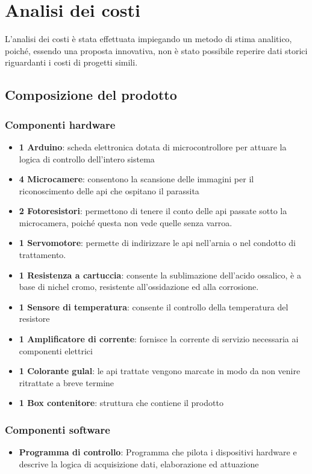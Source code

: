 \section{Analisi dei costi}
L'analisi dei costi è stata effettuata impiegando un metodo di stima analitico,
poiché, essendo una proposta innovativa, non è stato possibile reperire dati
storici riguardanti i costi di progetti simili.
%
%
\subsection{Composizione del prodotto}
\subsubsection{Componenti hardware}
\begin{itemize}
\item \textbf{1 Arduino}: scheda elettronica dotata di microcontrollore per
attuare la logica di controllo dell’intero sistema
\item \textbf{4 Microcamere}: consentono la scansione delle immagini per il
riconoscimento delle api che ospitano il parassita
\item \textbf{2 Fotoresistori}: permettono di tenere il conto delle api passate
sotto la microcamera, poiché questa non vede quelle senza varroa.
\item \textbf{1 Servomotore}: permette di indirizzare le api nell’arnia o nel
condotto di trattamento.
\item \textbf{1 Resistenza a cartuccia}: consente la sublimazione dell’acido
ossalico, è a base di nichel cromo, resistente all’ossidazione ed alla
corrosione.
\item \textbf{1 Sensore di temperatura}: consente il controllo della temperatura
del resistore
\item \textbf{1 Amplificatore di corrente}: fornisce la corrente di servizio
necessaria ai componenti elettrici
\item \textbf{1 Colorante gulal}: le api trattate vengono marcate in modo da non
venire ritrattate a breve termine
\item \textbf{1 Box contenitore}: struttura che contiene il prodotto
\end{itemize}
%
\subsubsection{Componenti software}
\begin{itemize}
\item \textbf{Programma di controllo}: Programma che pilota i dispositivi
hardware e descrive la logica di acquisizione dati, elaborazione ed attuazione
\end{itemize}
%
%
